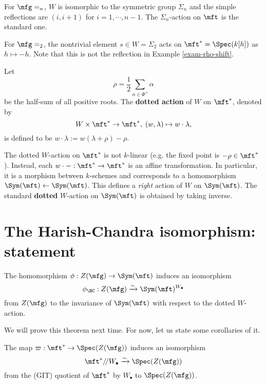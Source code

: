 \begin{exam}
	For $\mfg=\sl_n$, $W$ is isomorphic to the symmetric group $\Sigma_n$ and the simple reflections are $(i,i+1)$ for $i=1,\cdots,n-1$. The $\Sigma_n$-action on $\mft$ is the standard one.
\end{exam}

\begin{exam}
	For $\mfg=\sl_2$, the nontrivial element $s\in W=\Sigma_2$ acts on $\mft^* = \Spec(k[h])$ as $h\mapsto -h$. Note that this is not the reflection in Example \ref{exam-rho-shift}.
\end{exam}

\begin{defn}
	Let 
	\[
		\rho = \frac{1}{2}\sum_{\alpha\in \Phi^+} \alpha
	\]
	be the half-sum of all positive roots. The \textbf{dotted action} of $W$ on $\mft^*$, denoted by
	\[
		W\times \mft^* \to \mft^*,\; (w,\lambda)\mapsto w\cdot \lambda,
	\]
	is defined to be $w\cdot \lambda := w(\lambda+\rho)-\rho$.
\end{defn}

\begin{constr}
	The dotted $W$-action on $\mft^*$ is not $k$-linear (e.g. the fixed point is $-\rho\in \mft^*$). Instead, each $w\cdot -: \mft^* \to \mft^*$ is an affine transformation. In particular, it is a morphism between $k$-schemes and corresponds to a homomorphism $\Sym(\mft)\gets \Sym(\mft)$. This defines a \emph{right} action of $W$ on $\Sym(\mft)$. The standard \textbf{dotted} $W$-action on $\Sym(\mft)$ is obtained by taking inverse.
\end{constr}

\section{The Harish-Chandra isomorphism: statement}


\begin{thm}
	\label{thm-HC}
	The homomorphism $\phi: Z(\mfg) \to \Sym(\mft)$ induces an isomorphism
	\[
		\phi_\HC: Z(\mfg)  \xrightarrow{\sim} \Sym(\mft)^{W_\bullet}
	\]
	from $Z(\mfg)$ to the invariance of $\Sym(\mft)$ with respect to the dotted $W$-action.

\end{thm}
 
	We will prove this theorem next time. For now, let us state some corollaries of it.

\begin{cor}
	\label{cor-HC}
	The map $\varpi:\mft^* \to \Spec(Z(\mfg))$ induces an isomorphism
	\[
		\mft^*/\!/W_\bullet \xrightarrow{\sim} \Spec(Z(\mfg))
	\]
	from the (GIT) quotient of $\mft^*$ by $W_\bullet$ to $\Spec(Z(\mfg))$.
\end{cor}

